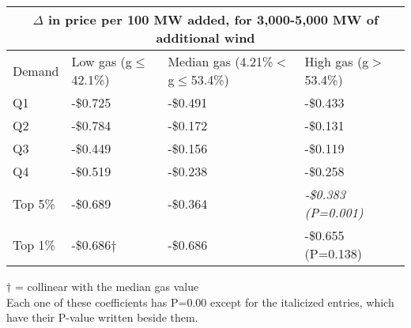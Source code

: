 \documentclass[11pt, oneside]{article}      %
\begin{document}
 \begin{center}
\begin{tabular}{ |p{2.5cm}||p{3.4cm}|p{3.4cm}|p{3.4cm}|  }
 \hline
 \multicolumn{4}{|c|}{$\Delta$ in price per 100 MW added, for 3,000-5,000 MW of additional wind} \\
 \hline
Demand & Low gas (g$\leq$42.1\%) & Median gas (4.21\%$<$g$\leq$53.4\%) & High gas (g$>$53.4\%) \\
 \hline
Q1 & -\$0.725 & -\$0.491 & -\$0.433 \\
 \hline
Q2 & -\$0.784 & -\$0.172 & -\$0.131 \\
 \hline
Q3 & -\$0.449 & -\$0.156 & -\$0.119 \\
 \hline
Q4 & -\$0.519 & -\$0.238 & -\$0.258 \\
 \hline
Top 5\% & -\$0.689 & -\$0.364 & \it{-\$0.383 (P=0.001)} \\
 \hline
Top 1\% & -\$0.686$\dagger$ & -\$0.686 & -\$0.655 (P=0.138) \\
 \hline
\end{tabular}
\end{center}

\footnotesize
$\dagger$ = collinear with the median gas value\\
Each one of these coefficients has P=0.00 except for the italicized entries, which have their P-value written beside them.

\newpage




\newpage

\setcounter{page}{48}
\setcounter{page}{48}





\setcounter{table}{0}
\renewcommand{\thetable}{A\arabic{table}}


\pagebreak
\pagebreak
\end{document}
